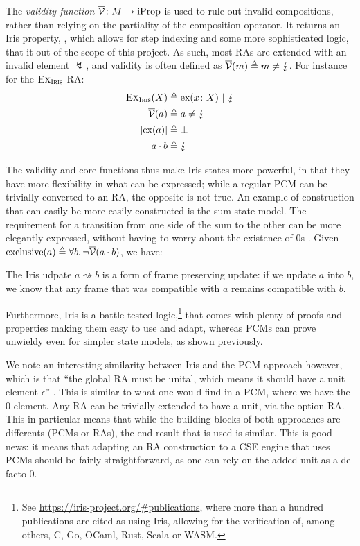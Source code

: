 The \emph{validity function} $\irisval\colon M\rarr \text{iProp}$ is used to rule out invalid compositions, rather than relying on the partiality of the composition operator. It returns an Iris property, , which allows for step indexing and some more sophisticated logic, that it out of the scope of this project. As such, most RAs are extended with an invalid element $\lightning$, and validity is often defined as $\irisval(m)\defeq m\neq \lightning$. For instance for the $\Ex_\Iris$ RA: \begin{align*}
	\Ex_\Iris(X) &\defeq \ex{x\colon X} ~|~ \lightning \\
	\irisval(a) &\defeq a \neq \lightning \\
	|\ex{a}| &\defeq \bot\\
	a \cdot b &\defeq \lightning
\end{align*}

The validity and core functions thus make Iris states more powerful, in that they have more flexibility in what can be expressed; while a regular PCM can be trivially converted to an RA, the opposite is not true. An example of construction that can easily be more easily constructed is the sum state model. The requirement for a transition from one side of the sum to the other can be more elegantly expressed, without having to worry about the existence of $0$s \cite{iris}. Given ${\text{exclusive}(a)\defeq \forall b\ldotp \neg\irisval(a\cdot b)}$, we have:\begin{mathpar}
\end{mathpar}

The Iris udpate $a \rightsquigarrow b$ is a form of frame preserving update: if we update $a$ into $b$, we know that any frame that was compatible with $a$ remains compatible with $b$.

Furthermore, Iris is a battle-tested logic,\footnote{See \url{https://iris-project.org/\#publications}, where more than a hundred publications are cited as using Iris, allowing for the verification of, among others, C, Go, OCaml, Rust, Scala or WASM.} that comes with plenty of proofs and properties making them easy to use and adapt, whereas PCMs can prove unwieldy even for simpler state models, as shown previously.

We note an interesting similarity between Iris and the PCM approach however, which is that ``the global RA must be unital, which means it should have a unit element $\epsilon$'' \cite{iris}. This is similar to what one would find in a PCM, where we have the $0$ element. Any RA can be trivially extended to have a unit, via the option RA. This in particular means that while the building blocks of both approaches are differents (PCMs or RAs), the end result that is used is similar. This is good news: it means that adapting an RA construction to a CSE engine that uses PCMs should be fairly straightforward, as one can rely on the added unit as a de facto $0$.

